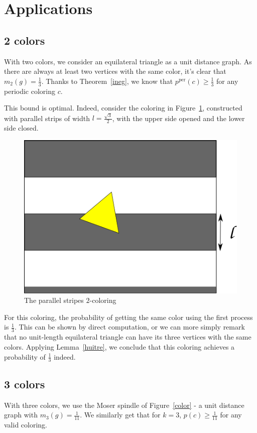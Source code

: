 \documentclass[a4paper,11pt]{article}
\theoremstyle{definition}
\theoremstyle{remark}
\newcommand{\pper}{p^{\mathrm{per}}}
\begin{document}
\section{Applications} \label{appli}
\subsection{2 colors} \label{2col}

With two colors, we consider an equilateral triangle as a unit distance graph. 
As there are always at least two vertices with the same color, it's clear that 
$m_2(g) = \frac{1}{3}$. Thanks to Theorem~\ref{ineg}, 
we know that $\pper(c) \geq \frac13$ for any periodic coloring $c$.

This bound is optimal. Indeed, consider the coloring in Figure~\ref{couleur}, 
constructed with parallel strips of width 
$l = \frac {\sqrt3}{2}$, with the upper side opened and the lower side closed. 

\begin{figure}[h]
\center
\includegraphics[scale=0.5]{path6509.png}
\caption{\label{couleur} The parallel stripes $2$-coloring}
\end{figure}

For this coloring, the probability of getting the same color using the first 
process is $\frac13$. This can be shown by direct computation, or we can 
more simply remark that no unit-length equilateral triangle can have its 
three vertices with the same colors. Applying Lemma~\ref{huitre}, we conclude 
that this coloring achieves a probability of $\frac{1}{3}$ indeed.

\subsection{3 colors}\label{3col}
 With three colors, we use the Moser spindle of Figure~\ref{color} - a unit 
 distance graph with $m_3(g) = \frac{1}{11}$.
 We similarly get that for $k=3$, $p(c) \geq \frac{1}{11}$ for any valid coloring. 
\end{document}
